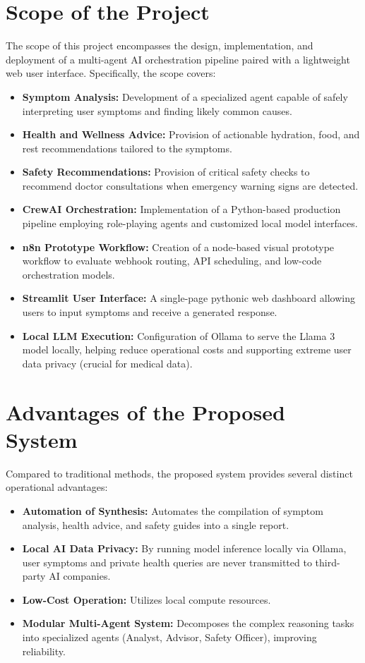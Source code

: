 \documentclass[12pt,a4paper]{report}
\begin{document}
\section{Scope of the Project}
The scope of this project encompasses the design, implementation, and deployment of a multi-agent AI orchestration pipeline paired with a lightweight web user interface. Specifically, the scope covers:
\begin{itemize}
    \item \textbf{Symptom Analysis:} Development of a specialized agent capable of safely interpreting user symptoms and finding likely common causes.
    \item \textbf{Health and Wellness Advice:} Provision of actionable hydration, food, and rest recommendations tailored to the symptoms.
    \item \textbf{Safety Recommendations:} Provision of critical safety checks to recommend doctor consultations when emergency warning signs are detected.
    \item \textbf{CrewAI Orchestration:} Implementation of a Python-based production pipeline employing role-playing agents and customized local model interfaces.
    \item \textbf{n8n Prototype Workflow:} Creation of a node-based visual prototype workflow to evaluate webhook routing, API scheduling, and low-code orchestration models.
    \item \textbf{Streamlit User Interface:} A single-page pythonic web dashboard allowing users to input symptoms and receive a generated response.
    \item \textbf{Local LLM Execution:} Configuration of Ollama to serve the Llama 3 model locally, helping reduce operational costs and supporting extreme user data privacy (crucial for medical data).
\end{itemize}

\section{Advantages of the Proposed System}
Compared to traditional methods, the proposed system provides several distinct operational advantages:
\begin{itemize}
    \item \textbf{Automation of Synthesis:} Automates the compilation of symptom analysis, health advice, and safety guides into a single report.
    \item \textbf{Local AI Data Privacy:} By running model inference locally via Ollama, user symptoms and private health queries are never transmitted to third-party AI companies.
    \item \textbf{Low-Cost Operation:} Utilizes local compute resources.
    \item \textbf{Modular Multi-Agent System:} Decomposes the complex reasoning tasks into specialized agents (Analyst, Advisor, Safety Officer), improving reliability.
\end{itemize}
\end{document}

